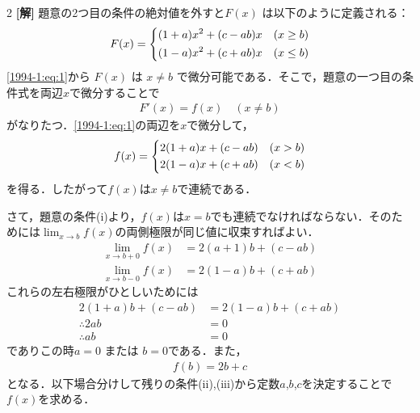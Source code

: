 \documentclass[../../main.tex]{subfiles}
\begin{document}
\setcounter{equation}{0}
\setcounter{figure}{0}
\setcounter{table}{0}
\begin{oframed}
  
\end{oframed}
\setlength{\columnseprule}{0.4pt}
\begin{multicols}{2}
  {\bf[解]}
  題意の2つ目の条件の絶対値を外すと$F(x)$ は以下のように定義される：
  \begin{align}
    F(x) =
    \begin{dcases}
      (1+a)x^2 + (c-ab)x & (x \ge b) \\
      (1-a)x^2 + (c+ab)x & (x \le b)
    \end{dcases}\label{1994-1:eq:1}
  \end{align}
  \cref{1994-1:eq:1}から $F(x)$ は $x\neq b$ で微分可能である．そこで，題意の一つ目の条件式を両辺$x$で微分することで
  \begin{align}
    F'(x) = f(x) \quad (x \ne b)
  \end{align}
  がなりたつ．\cref{1994-1:eq:1}の両辺を$x$で微分して，
  \begin{align}
    f(x) =
    \begin{dcases}
      2(1+a)x + (c-ab) & (x > b) \\
      2(1-a)x + (c+ab) & (x < b)
    \end{dcases}\label{1994-1:eq:2}
  \end{align}
  を得る．したがって$f(x)$は$x\neq b$で連続である．

  さて，題意の条件(i)より，$f(x)$は$x=b$でも連続でなければならない．そのためには$\displaystyle \lim_{x\to b} f(x)$の両側極限が同じ値に収束すればよい．
  \begin{align*}
    \lim_{x \to b+0} f(x) & = 2(a+1)b + (c-ab) \\
    \lim_{x \to b-0} f(x) & = 2(1-a)b + (c+ab)
  \end{align*}
  これらの左右極限がひとしいためには
  \begin{align*}
    2(1+a)b + (c-ab) & = 2(1-a)b + (c+ab) \\
    \therefore 2ab   & = 0                \\
    \therefore ab    & = 0
  \end{align*}
  でありこの時$a=0$ または $b=0$である．また，
  \begin{align}
    f(b) = 2b+c
  \end{align}
  となる．以下場合分けして残りの条件(ii),(iii)から定数$a$,$b$,$c$を決定することで$f(x)$を求める．


\end{multicols}
\end{document}
